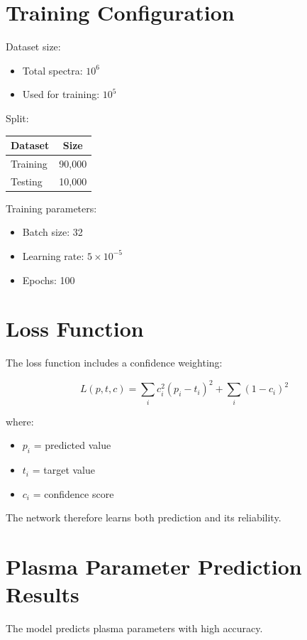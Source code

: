 \documentclass[12pt]{article}
\begin{document}
\section{Training Configuration}

Dataset size:

\begin{itemize}
\item Total spectra: $10^6$
\item Used for training: $10^5$
\end{itemize}

Split:

\begin{center}
\begin{tabular}{lc}
\toprule
Dataset & Size \\
\midrule
Training & 90,000 \\
Testing & 10,000 \\
\bottomrule
\end{tabular}
\end{center}

Training parameters:

\begin{itemize}
\item Batch size: 32
\item Learning rate: $5 \times 10^{-5}$
\item Epochs: 100
\end{itemize}

\section{Loss Function}
The loss function includes a confidence weighting:

\begin{equation}
L(p,t,c)=\sum_i c_i^2 (p_i - t_i)^2 + \sum_i (1-c_i)^2
\end{equation}

where:

\begin{itemize}
\item $p_i$ = predicted value
\item $t_i$ = target value
\item $c_i$ = confidence score
\end{itemize}

The network therefore learns both prediction and its reliability.

\section{Plasma Parameter Prediction Results}
The model predicts plasma parameters with high accuracy.
\end{document}
